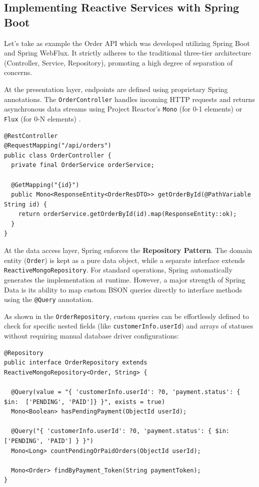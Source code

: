 \subsection{Implementing Reactive Services with Spring Boot}

Let's take as example the Order API which was developed utilizing Spring Boot and Spring WebFlux. It strictly adheres to the traditional three-tier architecture (Controller, Service, Repository), promoting a high degree of separation of concerns.

At the presentation layer, endpoints are defined using proprietary Spring annotations. The \texttt{OrderController} handles incoming HTTP requests and returns asynchronous data streams using Project Reactor's \texttt{Mono} (for 0-1 elements) or \texttt{Flux} (for 0-N elements) \cite{baeldung_flux_vs_mono}.

\begin{lstlisting}[language=JavaExtended, caption={Spring Boot WebFlux Controller Snippet}, label={lst:spring_controller}]
@RestController
@RequestMapping("/api/orders")
public class OrderController {
  private final OrderService orderService;

  @GetMapping("{id}")
  public Mono<ResponseEntity<OrderResDTO>> getOrderById(@PathVariable String id) {
    return orderService.getOrderById(id).map(ResponseEntity::ok);
  }
}
\end{lstlisting}

At the data access layer, Spring enforces the \textbf{Repository Pattern}. The domain entity (\texttt{Order}) is kept as a pure data object, while a separate interface extends \texttt{ReactiveMongoRepository}. For standard operations, Spring automatically generates the implementation at runtime. However, a major strength of Spring Data is its ability to map custom BSON queries directly to interface methods using the \texttt{@Query} annotation.

As shown in the \texttt{OrderRepository}, custom queries can be effortlessly defined to check for specific nested fields (like \texttt{customerInfo.userId}) and arrays of statuses without requiring manual database driver configurations:

\clearpage

\begin{lstlisting}[language=JavaExtended, caption={Spring Boot Reactive Mongo Repository}, label={lst:spring_repository}]
@Repository
public interface OrderRepository extends ReactiveMongoRepository<Order, String> {

  @Query(value = "{ 'customerInfo.userId': ?0, 'payment.status': { $in:  ['PENDING', 'PAID']} }", exists = true)
  Mono<Boolean> hasPendingPayment(ObjectId userId);

  @Query("{ 'customerInfo.userId': ?0, 'payment.status': { $in: ['PENDING', 'PAID'] } }")
  Mono<Long> countPendingOrPaidOrders(ObjectId userId);

  Mono<Order> findByPayment_Token(String paymentToken);
}
\end{lstlisting}

